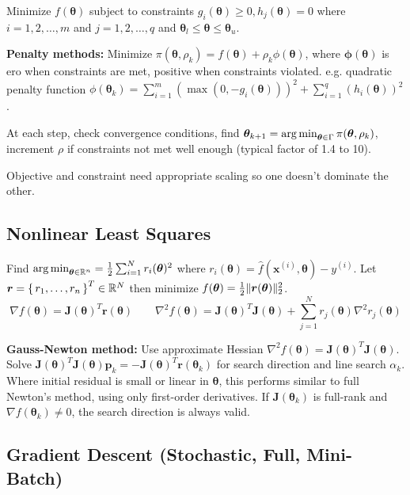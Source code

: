 \documentclass[twocolumn, 8pt]{extarticle}
\begin{document}
Minimize $f(\bm\theta)$ subject to constraints $g_i(\bm\theta) \geq 0, h_j(\bm\theta) = 0$ where $i = 1, 2, \dots, m$
and $j = 1, 2, \dots, q$ and $\bm\theta _l \leq \bm\theta \leq \bm\theta _u$.

\textbf{Penalty methods: } Minimize \(\pi(\bm\theta, \rho _k) = f(\bm\theta) + \rho _k\phi(\bm\theta)\), where
\(\bm\phi(\bm \theta)\) is ero when constraints are met, positive when constraints violated. e.g. quadratic penalty
function \(\phi(\bm\theta _k) = \sum _{i = 1}^m (\max(0, -g_i(\bm\theta)))^2 + \sum _{i = 1}^q (h_i(\bm\theta))^2\).

At each step, check convergence conditions, find \(\bm\theta _{k + 1} = \operatorname*{arg\,min} _{\bm\theta \in \Gamma}\pi(\bm\theta, \rho _k)\),
increment \(\rho\) if constraints not met well enough (typical factor of 1.4 to 10).

Objective and constraint need appropriate scaling so one doesn't dominate the other.

\subsection{Nonlinear Least Squares} %

Find $\operatorname*{arg\,min} _{\bm\theta \in \mathbb{R}^n} = \frac{1}{2}\sum _{i = 1}^N r_i(\bm\theta)^2$ where $r_i(\bm\theta) = \hat f(\bm x^{(i)}, \bm\theta) - y^{(i)}$.
Let $\bm r = \set{r_1, \dots, r_n}^T \in \mathbb{R}^N$ then minimize $f(\bm\theta) = \frac{1}{2}\lVert\bm r(\bm\theta)\rVert_2^2$.
\[
    \nabla f(\bm\theta) = \bm J(\bm\theta)^T\bm r(\bm\theta) \qquad 
    \nabla^2 f(\bm\theta)= \bm J(\bm\theta)^T\bm J(\bm\theta) + \sum _{j = 1}^N r_j(\bm\theta)\nabla^2 r_j(\bm\theta)
\]

\textbf{Gauss-Newton method:} Use approximate Hessian \(\nabla^2 f(\bm\theta) = \bm J(\bm\theta)^T\bm J(\bm\theta)\).
Solve \(\bm J(\bm\theta)^T\bm J(\bm\theta)\bm p_k = -\bm J(\bm\theta)^T\bm r(\bm\theta _k)\) for search direction and
line search \(\alpha _k\). Where initial residual is small or linear in $\bm\theta$, this performs similar to full
Newton's method, using only first-order derivatives.
If $\bm J(\bm\theta _k)$ is full-rank and $\nabla f(\bm\theta _k) \neq 0$, the search direction is always valid.

\subsection{Gradient Descent (Stochastic, Full, Mini-Batch)} %
\end{document}
